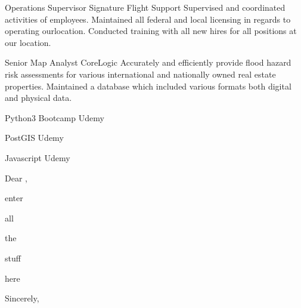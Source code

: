 \documentclass[letterpaper]{ReadableCV}
\begin{document}
{Operations Supervisor}
{Signature Flight Support}
{Supervised and coordinated activities of employees. Maintained all federal and local licensing in regards to operating ourlocation. Conducted training with all new hires for all positions at our location.}


{Senior Map Analyst}
{CoreLogic}
{Accurately and efficiently provide flood hazard risk assessments for various international and nationally owned real estate properties. Maintained a database which included various formats both digital and physical data.}



{Python3 Bootcamp}
{Udemy}{}

{PostGIS}
{Udemy}{}

{Javascript}
{Udemy}{}

         
          
\clearpage
 
 
\showHeader




\makeLetter

Dear \recpname,

\bigskip

enter

all

the 

stuff

here

\bigskip

Sincerely, %

\end{document}
